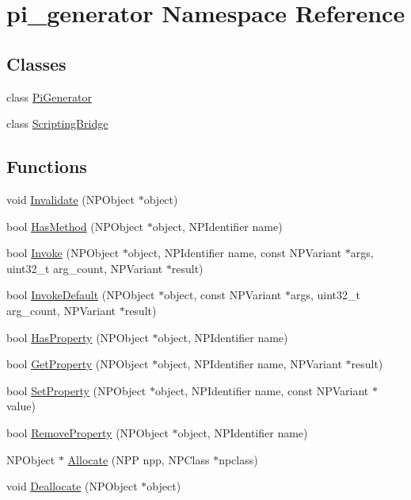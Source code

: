 \hypertarget{namespacepi__generator}{
\section{pi\_\-generator Namespace Reference}
\label{namespacepi__generator}
}
\subsection*{Classes}
\begin{DoxyCompactItemize}
\item 
class \hyperlink{classpi__generator_1_1_pi_generator}{PiGenerator}
\item 
class \hyperlink{classpi__generator_1_1_scripting_bridge}{ScriptingBridge}
\end{DoxyCompactItemize}
\subsection*{Functions}
\begin{DoxyCompactItemize}
\item 
void \hyperlink{namespacepi__generator_a733df66e71ec7f2dba460c638180aa0e}{Invalidate} (NPObject $\ast$object)
\item 
bool \hyperlink{namespacepi__generator_a952c6436fb4cc8d87e830f81f3bae284}{HasMethod} (NPObject $\ast$object, NPIdentifier name)
\item 
bool \hyperlink{namespacepi__generator_a861f69824d0671573232af470d07c0fa}{Invoke} (NPObject $\ast$object, NPIdentifier name, const NPVariant $\ast$args, uint32\_\-t arg\_\-count, NPVariant $\ast$result)
\item 
bool \hyperlink{namespacepi__generator_a7fab356f3ceba853332861bcc927c54f}{InvokeDefault} (NPObject $\ast$object, const NPVariant $\ast$args, uint32\_\-t arg\_\-count, NPVariant $\ast$result)
\item 
bool \hyperlink{namespacepi__generator_a87a1eff2d42a1e673e616057680369b7}{HasProperty} (NPObject $\ast$object, NPIdentifier name)
\item 
bool \hyperlink{namespacepi__generator_aa945b983b43a437de8e06ebbbe8f6064}{GetProperty} (NPObject $\ast$object, NPIdentifier name, NPVariant $\ast$result)
\item 
bool \hyperlink{namespacepi__generator_a54b3ed1c0ca9069974a0a575680896c9}{SetProperty} (NPObject $\ast$object, NPIdentifier name, const NPVariant $\ast$value)
\item 
bool \hyperlink{namespacepi__generator_ae5666fa423e3664b2c082f0e8b2fcfd4}{RemoveProperty} (NPObject $\ast$object, NPIdentifier name)
\item 
NPObject $\ast$ \hyperlink{namespacepi__generator_a94f67bed2d50304566aa1f7c35f91ab2}{Allocate} (NPP npp, NPClass $\ast$npclass)
\item 
void \hyperlink{namespacepi__generator_a36cb8ad170a393eedf2f477fa7561f62}{Deallocate} (NPObject $\ast$object)
\end{DoxyCompactItemize}


